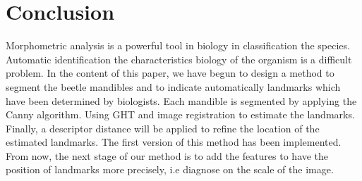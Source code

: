 \documentclass[twoside,twocolumn,10pt]{article}
\begin{document}
\section{Conclusion}
Morphometric analysis is a powerful tool in biology in classification
the species. Automatic identification the characteristics biology of
the organism is a difficult problem. In the content of this paper, we
have begun to design a method to segment the beetle mandibles and to
indicate automatically landmarks which have been determined by
biologists. Each mandible is segmented by applying the Canny
algorithm. Using GHT and image registration to estimate the
landmarks. Finally, a descriptor distance will be applied to refine the
location of the estimated landmarks. The first version of this method
has been implemented. From now, the next stage of our method is to add
the features to have the position of landmarks more precisely, i.e diagnose on the scale of the image.




\end{document}

